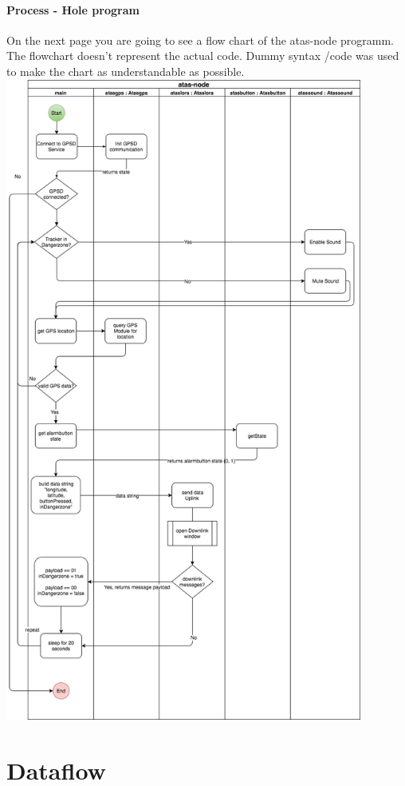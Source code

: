 \documentclass[a4paper,11pt, oneside]{report}
\theoremstyle{definition}
\begin{document}
\subsubsection{Process - Hole program}
On the next page you are going to see a flow chart of the atas-node programm. The flowchart doesn't represent the actual code. Dummy syntax /code was used to make the chart as understandable as possible.
\newpage
\includegraphics[width=0.88\textwidth]{img/atas-node-process}\\

\chapter{Dataflow}
\end{document}
